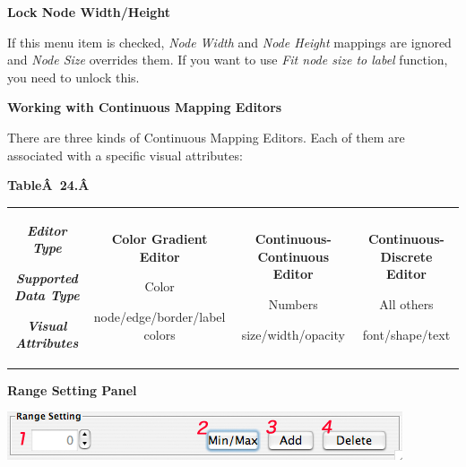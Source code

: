  
\textbf{Lock Node Width/Height}


 If this menu item is checked, \emph{Node Width}
 and \emph{Node Height}
 mappings are ignored and \emph{Node Size}
 overrides them. If you want to use \emph{Fit node size to label}
 function, you need to unlock this. 


 

\textbf{Working with Continuous Mapping Editors}


 There are three kinds of Continuous Mapping Editors. Each of them are associated with a specific visual attributes: 


 \textbf{Table\^A 24.\^A }



\begin{tabular}{|c|c|c|c|}
\hline 
 & & & \\
 \hline 


 \emph{\textbf{Editor Type}
}



 \emph{\textbf{Supported Data Type}
}



 \emph{\textbf{Visual Attributes}
}

 &

 \textbf{Color Gradient Editor}



  Color 


  node/edge/border/label colors 
 &

 \textbf{Continuous-Continuous Editor}



  Numbers 


  size/width/opacity 
 &

 \textbf{Continuous-Discrete Editor}



  All others 


  font/shape/text 
 \\
 \hline 

\end{tabular}


 \textbf{Range Setting Panel}


 \includegraphics[width=.6\textwidth]{images/RangeSetting26.png} 


